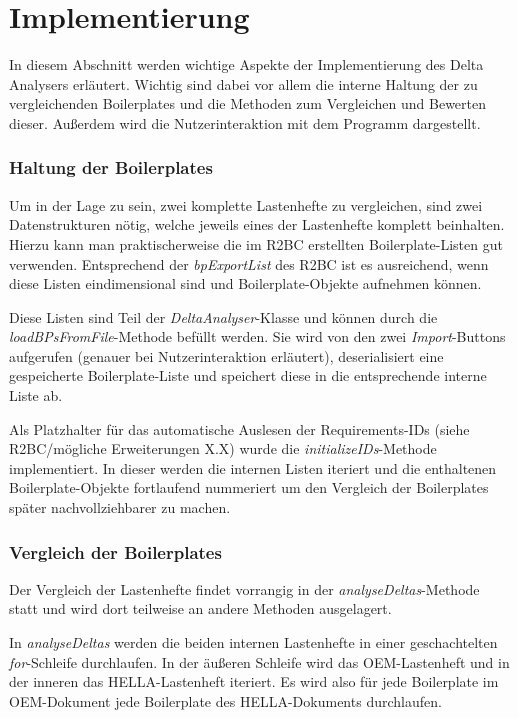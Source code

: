 \documentclass[12pt]{report}
\begin{document}
\section{Implementierung}
In diesem Abschnitt werden wichtige Aspekte der Implementierung des Delta Analysers erläutert. Wichtig sind dabei vor allem die interne Haltung der zu vergleichenden Boilerplates und die Methoden zum Vergleichen und Bewerten dieser. Außerdem wird die Nutzerinteraktion mit dem Programm dargestellt. 
\subsubsection{Haltung der Boilerplates}
Um in der Lage zu sein, zwei komplette Lastenhefte zu vergleichen, sind zwei Datenstrukturen nötig, welche jeweils eines der Lastenhefte komplett beinhalten. Hierzu kann man praktischerweise die im R2BC erstellten Boilerplate-Listen gut verwenden. Entsprechend der \textit{bpExportList} des R2BC ist es ausreichend, wenn diese Listen eindimensional sind und Boilerplate-Objekte aufnehmen können. 

Diese Listen sind Teil der \textit{DeltaAnalyser}-Klasse und können durch die \textit{loadBPsFromFile}-Methode befüllt werden. Sie wird von den zwei \textit{Import}-Buttons aufgerufen (genauer bei Nutzerinteraktion erläutert), deserialisiert eine gespeicherte Boilerplate-Liste und speichert diese in die entsprechende interne Liste ab.

Als Platzhalter für das automatische Auslesen der Requirements-IDs (siehe R2BC/mögliche Erweiterungen X.X) wurde die \textit{initializeIDs}-Methode implementiert. In dieser werden die internen Listen iteriert und die enthaltenen Boilerplate-Objekte fortlaufend nummeriert um den Vergleich der Boilerplates später nachvollziehbarer zu machen. 

\subsubsection{Vergleich der Boilerplates}
Der Vergleich der Lastenhefte findet vorrangig in der \textit{analyseDeltas}-Methode statt und wird dort teilweise an andere Methoden ausgelagert.

In \textit{analyseDeltas} werden die beiden internen Lastenhefte in einer geschachtelten \textit{for}-Schleife durchlaufen. In der äußeren Schleife wird das OEM-Lastenheft und in der inneren das HELLA-Lastenheft iteriert. Es wird also für jede Boilerplate im OEM-Dokument jede Boilerplate des HELLA-Dokuments durchlaufen. 
\end{document}
